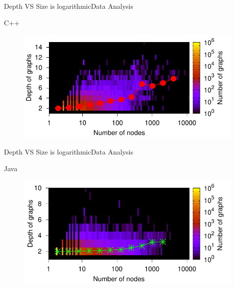 \documentclass[11pt,svgnames]{beamer}
\begin{document}
\begin{frame}{Depth VS Size is logarithmic}{Data Analysis}
\begin{tcolorbox}[colframe=red]
\center
 C++
\end{tcolorbox}
\begin{figure}[p]%
\includegraphics[width=12cm,draft=false]{immagini/mapcpp.pdf}
\end{figure}
\end{frame}

\begin{frame}[noframenumbering]{Depth VS Size is logarithmic}{Data Analysis}
\begin{tcolorbox}[colframe=green]
\center
 Java
\end{tcolorbox}
\begin{figure}[p]%
\includegraphics[width=12cm,draft=false]{immagini/mapjava.pdf}
\end{figure}

\end{frame}
\end{document}
